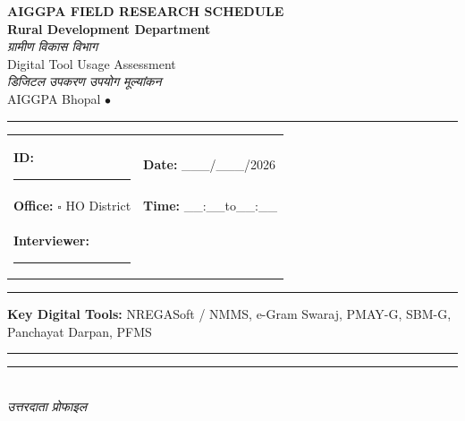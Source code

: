 \documentclass[10pt,a4paper]{article}
\newcommand{\blank}{\rule{7cm}{0.4pt}}
\begin{document}
\begin{center}
{\Large\bfseries AIGGPA FIELD RESEARCH SCHEDULE}\\[1pt]
{\large\bfseries Rural Development Department}\\[1pt]
{\hindifont\itshape\color{black!70} ग्रामीण विकास विभाग}\\[4pt]
{\small Digital Tool Usage Assessment}\\[1pt]
{\small\hindifont\itshape\color{black!70} डिजिटल उपकरण उपयोग मूल्यांकन}\\[3pt]
{\small AIGGPA Bhopal \quad$\bullet$}
\end{center}
\vspace{4pt}\noindent\rule{\textwidth}{1pt}\vspace{4pt}
\noindent\begin{tabularx}{\textwidth}{@{}L{9.5cm} X@{}}
\textbf{ID:} \blank & \textbf{Date:} \_\_\_/\_\_\_/2026 \\[4pt]
\textbf{Office:} {\Large$\square$} HO\quad{\Large$\square$} District & \textbf{Time:} \_\_:\_\_\quad to\quad\_\_:\_\_ \\[4pt]
\textbf{Interviewer:} \blank & \\
\end{tabularx}
\vspace{4pt}\noindent\rule{\textwidth}{0.5pt}\vspace{4pt}
\noindent\textbf{Key Digital Tools:} NREGASoft / NMMS, e-Gram Swaraj, PMAY-G, SBM-G, Panchayat Darpan, PFMS
\vspace{3pt}\noindent\rule{\textwidth}{0.5pt}
\noindent\rule{\textwidth}{0.3pt}\vspace{3pt}
\\
{\hindifont\itshape\color{black!70} उत्तरदाता प्रोफाइल}\vspace{3pt}
\end{document}
